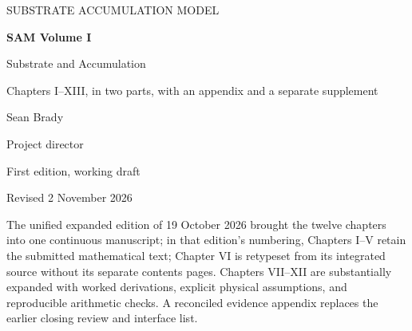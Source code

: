 
\newcommand{\ChapterRoman}{Front matter}
\onecolumn{}\thispagestyle{empty}
\begin{center}
\vspace*{0.8in}
{\small SUBSTRATE ACCUMULATION MODEL\par}\vspace{0.35in}
{\Huge\bfseries SAM Volume I\par}\vspace{0.15in}
{\LARGE Substrate and Accumulation\par}\vspace{0.18in}
{\large Chapters I--XIII, in two parts, with an appendix and a separate supplement\par}\vspace{0.65in}
{\Large Sean Brady\par}\vspace{0.08in}
{\normalsize Project director\par}\vspace{0.5in}
{\large First edition, working draft\par}
{\normalsize Revised 2 November 2026\par}
\end{center}
\vfill
\noindent The unified expanded edition of 19 October 2026 brought the twelve chapters into one continuous manuscript; in that edition's numbering, Chapters I--V retain the submitted mathematical text; Chapter VI is retypeset from its integrated source without its separate contents pages. Chapters VII--XII are substantially expanded with worked derivations, explicit physical assumptions, and reproducible arithmetic checks. A reconciled evidence appendix replaces the earlier closing review and interface list.

